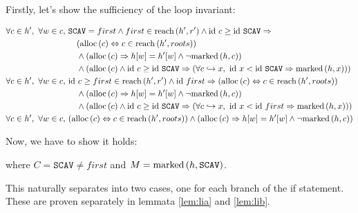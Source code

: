 \begin{lemma}
  Firstly, let's show the sufficiency of the loop invariant:

  \begin{align*}
    \forall c \in h',\ \forall w \in c,\ 
    &\mathtt{SCAV} = first \land first \in \reach{h'}{r'} \land
    \id~c \geq \id~\mathtt{SCAV} \implies\\
    &\quad(\alloc{c} \iff c \in \reach{h'}{roots})\\
    &\quad\land (\alloc{c} \implies h[w] = h'[w] \land \lnot
    \marked{h}{c})\\
    &\quad\land (\alloc{c} \land \id~c \geq \id~\mathtt{SCAV} \implies
    (\forall c \pointsto x,\ \id~x < \id~\mathtt{SCAV} \implies
    \marked{h}{x}))\\
%
    \forall c \in h',\ \forall w \in c,\ 
    &\id~c \geq first \in \reach{h'}{r'} \land \id~first
    \implies (\alloc{c} \iff c \in \reach{h'}{roots})\\
    &\quad\land (\alloc{c} \implies h[w] = h'[w] \land \lnot
    \marked{h}{c})\\
    &\quad\land (\alloc{c} \land \id~c \geq \id~\mathtt{SCAV} \implies
    (\forall c \pointsto x,\ \id~x < \id~first \implies
    \marked{h}{x}))\\
%
    \forall c \in h',\ \forall w \in c,\ 
    &(\alloc{c} \iff c \in \reach{h'}{roots}) \land (\alloc{c}
    \implies h[w] = h'[w] \land \lnot \marked{h}{c})
  \end{align*}

  Now, we have to show it holds:

  \begin{prooftree}
  \end{prooftree}

  where $C = \mathtt{SCAV} \neq first$ and $M =
  \mathrm{marked}\left(h, \mathtt{SCAV}\right)$.

  This naturally separates into two cases, one for each branch of the
  if statement. These are proven separately in lemmata \ref{lem:lia}
  and \ref{lem:lib}.
  \label{lem:li}
\end{lemma}

